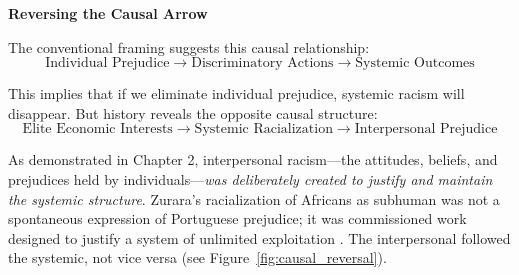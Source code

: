 \documentclass[12pt,openany]{book}
\begin{document}
\textbf{Reversing the Causal Arrow}

The conventional framing suggests this causal relationship:
\[
\text{Individual Prejudice} \rightarrow \text{Discriminatory Actions} \rightarrow \text{Systemic Outcomes}
\]

This implies that if we eliminate individual prejudice, systemic racism will disappear. But history reveals the opposite causal structure:
\[
\text{Elite Economic Interests} \rightarrow \text{Systemic Racialization} \rightarrow \text{Interpersonal Prejudice}
\]

As demonstrated in Chapter 2, interpersonal racism---the attitudes, beliefs, and prejudices held by individuals---\textit{was deliberately created to justify and maintain the systemic structure}. Zurara's racialization of Africans as subhuman was not a spontaneous expression of Portuguese prejudice; it was commissioned work designed to justify a system of unlimited exploitation \cite{zurara, biewen}. The interpersonal followed the systemic, not vice versa (see Figure~\ref{fig:causal_reversal}).
\end{document}

